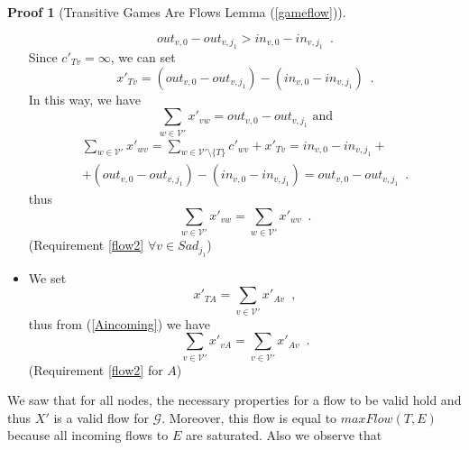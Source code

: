 \documentclass[11pt]{llncs}
\theoremstyle{definition}
\newtheorem*{sepproof}{Proof}
\begin{document}
\begin{sepproof}[Transitive Games Are Flows Lemma (\ref{gameflow})]
\begin{itemize}
          \begin{equation*}
             out_{v, 0} - out_{v, j_1} > in_{v, 0} - in_{v, j_1} \enspace.
          \end{equation*}
          Since $c'_{Tv} = \infty$, we can set
          \begin{equation*}
             x'_{Tv} = \left(out_{v, 0} - out_{v, j_1}\right) - \left(in_{v, 0} - in_{v, j_1}\right) \enspace.
          \end{equation*}
          In this way, we have
          \begin{equation*}
             \sum\limits_{w \in \mathcal{V}'}x'_{vw} = out_{v, 0} - out_{v, j_1} \mbox{ and}
          \end{equation*}
          \begin{equation*}
          \begin{gathered}
             \sum\limits_{w \in \mathcal{V}'}x'_{wv} = \sum\limits_{w \in \mathcal{V}' \setminus \{T\}}c'_{wv} + x'_{Tv} =
             in_{v, 0} - in_{v, j_1} + \\ + (out_{v, 0} - out_{v, j_1}) - (in_{v, 0} - in_{v, j_1}) = out_{v, 0} -
             out_{v, j_1} \enspace.
          \end{gathered}
          \end{equation*}
          thus
          \begin{equation*}
             \sum\limits_{w \in \mathcal{V}'}x'_{vw} = \sum\limits_{w \in \mathcal{V}'}x'_{wv} \enspace.
          \end{equation*}
          (Requirement \ref{flow2} $\forall v \in Sad_{j_1}$)
          \item We set
          \begin{equation*}
             x'_{TA} = \sum\limits_{v \in \mathcal{V}'}x'_{Av} \enspace,
          \end{equation*}
          thus from (\ref{Aincoming}) we have
          \begin{equation*}
             \sum\limits_{v \in \mathcal{V}'}x'_{vA} = \sum\limits_{v \in \mathcal{V}'}x'_{Av} \enspace.
          \end{equation*}
          (Requirement \ref{flow2} for $A$)
       \end{itemize}
       We saw that for all nodes, the necessary properties for a flow to be valid hold and thus $X'$ is a valid flow for
       $\mathcal{G}$. Moreover, this flow is equal to $maxFlow(T, E)$ because all incoming flows to $E$ are saturated.
       Also we observe that
       \begin{equation}

\end{equation}
\end{sepproof}
\end{document}
